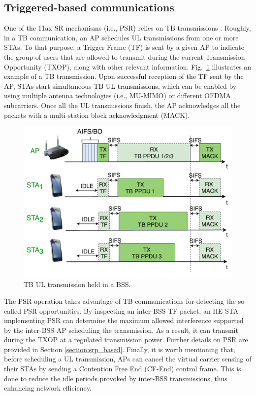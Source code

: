 \documentclass{ieeeaccess}
\begin{document}
\subsection{Triggered-based communications}
\label{section:tb_communication}
\textcolor{black}{One of the 11ax SR mechanisms (i.e., PSR)} relies on TB transmissions \cite{bellalta2019ap}. Roughly, in a TB communication, an AP schedules UL transmissions from one or more STAs. To that purpose, a Trigger Frame (TF) is sent by a given AP to indicate the group of users that are allowed to transmit during the current Transmission Opportunity (TXOP), along with other relevant information. \textcolor{black}{Fig.~\ref{fig:TB_transmission_example} illustrates an example of a TB transmission. Upon successful reception of the TF sent by the AP, STAs start simultaneous TB UL transmissions,} which can be enabled by using multiple antenna technologies (i.e., MU-MIMO) or different OFDMA subcarriers. Once all the UL transmissions finish, the AP acknowledges all the packets with a multi-station block \textcolor{black}{acknowledgment} (MACK).

\begin{figure}[ht!]
	\centering
	\includegraphics[width=.95\columnwidth]{fig_8}
	\caption{TB UL transmission held in a BSS.}
	\label{fig:TB_transmission_example}
\end{figure}

\textcolor{black}{The PSR operation} takes advantage of TB communications for detecting the so-called PSR opportunities. By inspecting an inter-BSS TF packet, an HE STA implementing PSR can determine the maximum allowed interference supported by the inter-BSS AP scheduling the transmission. As a result, it can transmit during the TXOP at a regulated transmission power. Further details on PSR are provided in Section \ref{section:srp_based}. Finally, it is worth mentioning that, before scheduling a UL transmission, APs can cancel the virtual carrier sensing of their STAs by sending a Contention Free End (CF-End) control frame. This is done to reduce the idle periods provoked by inter-BSS transmissions, thus enhancing network efficiency. 
\end{document}
